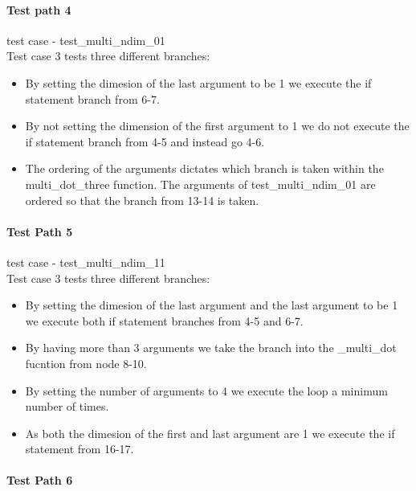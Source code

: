 \paragraph{Test path 4}
test case - test\_multi\_ndim\_01\\ 
Test case 3 tests three different branches:\\
\begin{itemize}
\item By setting the dimesion of the last argument to be 1  we execute the if statement branch from  6-7.
\item By not setting the dimension of the first argument to 1 we do not execute the if statement branch from 4-5 and instead go 4-6.
\item The ordering of the arguments dictates which branch is taken within the multi\_dot\_three function. The arguments of test\_multi\_ndim\_01 are ordered so that the branch from 13-14 is taken. 
\end{itemize}



\paragraph{Test Path 5}

test case - test\_multi\_ndim\_11\\
Test case 3 tests three different branches:\\
\begin{itemize}
\item By setting the dimesion of the last argument and the last argument to be 1  we execute both if statement branches from 4-5 and  6-7.
\item By having more than 3 arguments we take the branch into the \_multi\_dot fucntion from node 8-10. 
\item By setting the number of arguments to 4 we execute the loop a minimum number of times.   
\item As both the dimesion of the first and last argument are 1 we execute the if statement from 16-17.   
\end{itemize}


\paragraph{Test Path 6} %


